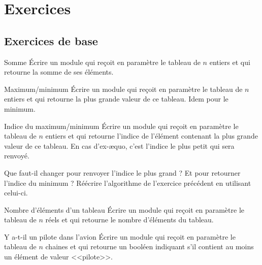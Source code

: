 	

\section{Exercices}

\subsection{Exercices de base}

\begin{Exercice}{Somme}
	Écrire un module qui reçoit en paramètre le tableau
	 de $n$ entiers 
	et qui retourne la somme de ses éléments.
\end{Exercice}

\begin{Exercice}{Maximum/minimum}
	Écrire un module qui reçoit en paramètre le tableau
	 de $n$ entiers et qui
	retourne la plus grande valeur de ce tableau. Idem pour le minimum.
\end{Exercice}

\begin{Exercice}{Indice du maximum/minimum}
	\label{ex:indiceminmax}
	Écrire un module qui reçoit en paramètre le tableau
	 de $n$ entiers et qui
	retourne l’indice de l’élément contenant la plus grande valeur de ce
	tableau. 
	En cas d’ex-æquo, c’est l’indice le plus petit qui sera renvoyé.
	
	Que faut-il changer pour renvoyer l’indice le plus grand ?
	Et pour retourner l’indice du minimum ? 
	Réécrire l’algorithme de l’exercice précédent en utilisant celui-ci.
\end{Exercice}

\begin{Exercice}{Nombre d'éléments d'un tableau}
	Écrire un module qui reçoit en paramètre le tableau
	 de $n$ réels et qui
	retourne le nombre d’éléments du tableau.
\end{Exercice}

\begin{Exercice}{Y a-t-il un pilote dans l'avion}
	Écrire un module qui reçoit en paramètre le tableau
	 de $n$ chaines 
	et qui retourne un booléen 
	indiquant s'il contient au moins un élément de 
	valeur <<pilote>>. 
\end{Exercice}

